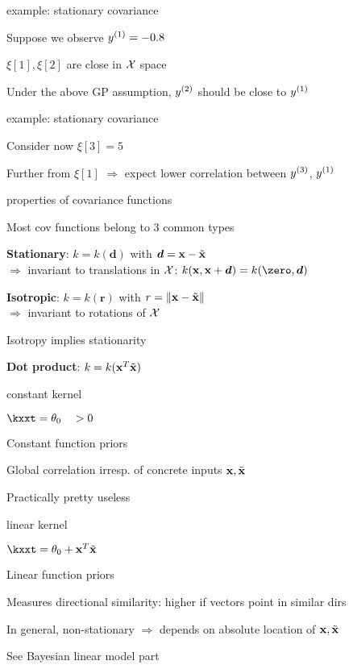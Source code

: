 \documentclass[11pt,compress,t,notes=noshow, xcolor=table]{beamer}
\begin{document}
\begin{framei}{example: stationary covariance}
\item Suppose we observe $\yi[1] = -0.8$
\item $\xi[1], \xi[2]$ are close in $\Xspace$ space
\item Under the above GP assumption, $\yi[2]$ should be close to $\yi[1]$ 
\vfill
{}
\end{framei}

\begin{framei}{example: stationary covariance}
\item Consider now $\xi[3] = 5$
\item Further from $\xi[1]$ $\Rightarrow$ expect lower correlation between $\yi[3]$, $\yi[1]$ 
\vfill
{}
\end{framei}

\begin{framei}[sep=L]{properties of covariance functions}
\item Most cov functions belong to 3 common types
\item \textbf{Stationary}: $k = k(\bm{d})$ with $\bm{d} = \xv - \xtil$ \\
$\Rightarrow$ invariant to translations in $\Xspace$: $k(\xv, \xv + \bm{d}) = k(\zero, \bm{d})$
\item \textbf{Isotropic}: $k = k(\bm{r})$ with $r = \xxtnorm$ \\
$\Rightarrow$ invariant to rotations of $\Xspace$
\item Isotropy implies stationarity
\item \textbf{Dot product}: $k = k(\xv^T \xtil)$
\end{framei}

\begin{framei}{constant kernel}
\item $\kxxt = \theta_0 \quad > 0$
\item Constant function priors
\item Global correlation irresp. of concrete inputs $\xv, \xtil$
\item Practically pretty useless
\vfill
{}
\end{framei}

\begin{framei}{linear kernel}
\item $\kxxt = \theta_0 + \xv^T \xtil$
\item Linear function priors
\item Measures directional similarity: higher if vectors point in similar dirs
\item In general, non-stationary $\Rightarrow$ depends on absolute location of $\xv, \xtil$
\item See Bayesian linear model part
\vfill
{}
\end{framei}
\end{document}
